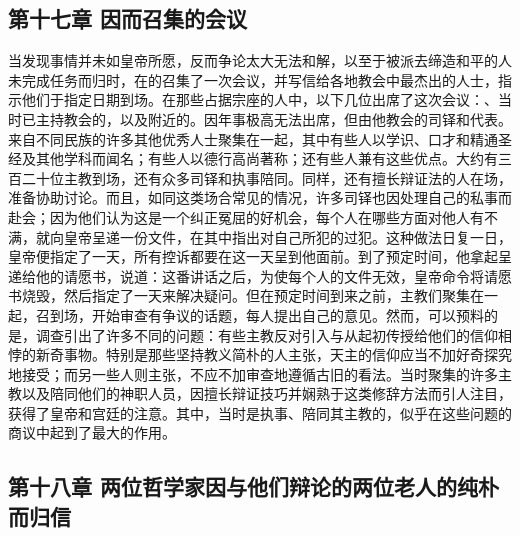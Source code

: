 
\subsection{第十七章 因而召集的会议}

当发现事情并未如皇帝所愿，反而争论太大无法和解，以至于被派去缔造和平的人未完成任务而归时，在的召集了一次会议，并写信给各地教会中最杰出的人士，指示他们于指定日期到场。在那些占据宗座的人中，以下几位出席了这次会议：、当时已主持教会的，以及附近的。因年事极高无法出席，但由他教会的司铎和代表。来自不同民族的许多其他优秀人士聚集在一起，其中有些人以学识、口才和精通圣经及其他学科而闻名；有些人以德行高尚著称；还有些人兼有这些优点。大约有三百二十位主教到场，还有众多司铎和执事陪同。同样，还有擅长辩证法的人在场，准备协助讨论。而且，如同这类场合常见的情况，许多司铎也因处理自己的私事而赴会；因为他们认为这是一个纠正冤屈的好机会，每个人在哪些方面对他人有不满，就向皇帝呈递一份文件，在其中指出对自己所犯的过犯。这种做法日复一日，皇帝便指定了一天，所有控诉都要在这一天呈到他面前。到了预定时间，他拿起呈递给他的请愿书，说道：这番讲话之后，为使每个人的文件无效，皇帝命令将请愿书烧毁，然后指定了一天来解决疑问。但在预定时间到来之前，主教们聚集在一起，召到场，开始审查有争议的话题，每人提出自己的意见。然而，可以预料的是，调查引出了许多不同的问题：有些主教反对引入与从起初传授给他们的信仰相悖的新奇事物。特别是那些坚持教义简朴的人主张，天主的信仰应当不加好奇探究地接受；而另一些人则主张，不应不加审查地遵循古旧的看法。当时聚集的许多主教以及陪同他们的神职人员，因擅长辩证技巧并娴熟于这类修辞方法而引人注目，获得了皇帝和宫廷的注意。其中，当时是执事、陪同其主教的，似乎在这些问题的商议中起到了最大的作用。\par


\subsection{第十八章 两位哲学家因与他们辩论的两位老人的纯朴而归信}

